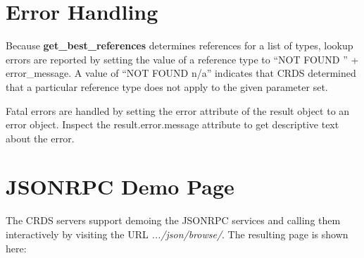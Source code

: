 \documentclass[letterpaper,10pt,english]{sphinxmanual}
\begin{document}
\section{Error Handling}
\label{web_services:error-handling}
Because \textbf{get\_best\_references} determines references for a list of types,  lookup
errors are reported by setting the value of a reference type to
``NOT FOUND '' + error\_message.   A value of ``NOT FOUND n/a'' indicates that CRDS
determined that a particular reference type does not apply to the given
parameter set.

Fatal errors are handled by setting the error attribute of the result object to
an error object.   Inspect the result.error.message attribute to get descriptive
text about the error.


\section{JSONRPC Demo Page}
\label{web_services:jsonrpc-demo-page}
The CRDS servers support demoing the JSONRPC services and calling them interactively
by visiting the URL \emph{.../json/browse/}.    The resulting page is shown here:
\begin{figure}[htbp]
\centering

\end{figure}
\end{document}

